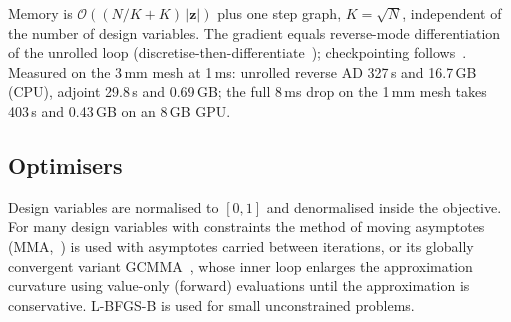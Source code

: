 \documentclass[11pt,a4paper]{article}
\newcommand{\vect}[1]{\bm{#1}}
\begin{document}
Memory is $\mathcal O((N/K + K)\,|\vect z|)$ plus one step graph, $K=\sqrt N$, independent of the number of
design variables. The gradient equals reverse-mode differentiation of the unrolled loop
(discretise-then-differentiate~\cite{jensen2014}); checkpointing follows~\cite{griewank2000}. Measured on the
3\,mm mesh at 1\,ms: unrolled reverse AD 327\,s and 16.7\,GB (CPU), adjoint 29.8\,s and 0.69\,GB; the full
8\,ms drop on the 1\,mm mesh takes 403\,s and 0.43\,GB on an 8\,GB GPU.

\subsection{Optimisers}
Design variables are normalised to $[0,1]$ and denormalised inside the objective. For many design
variables with constraints the method of moving asymptotes (MMA,~\cite{svanberg1987}) is used with asymptotes
carried between iterations, or its globally convergent variant GCMMA~\cite{svanberg2002}, whose inner loop
enlarges the approximation curvature using value-only (forward) evaluations until the approximation is
conservative. L-BFGS-B is used for small unconstrained problems.

\end{document}
